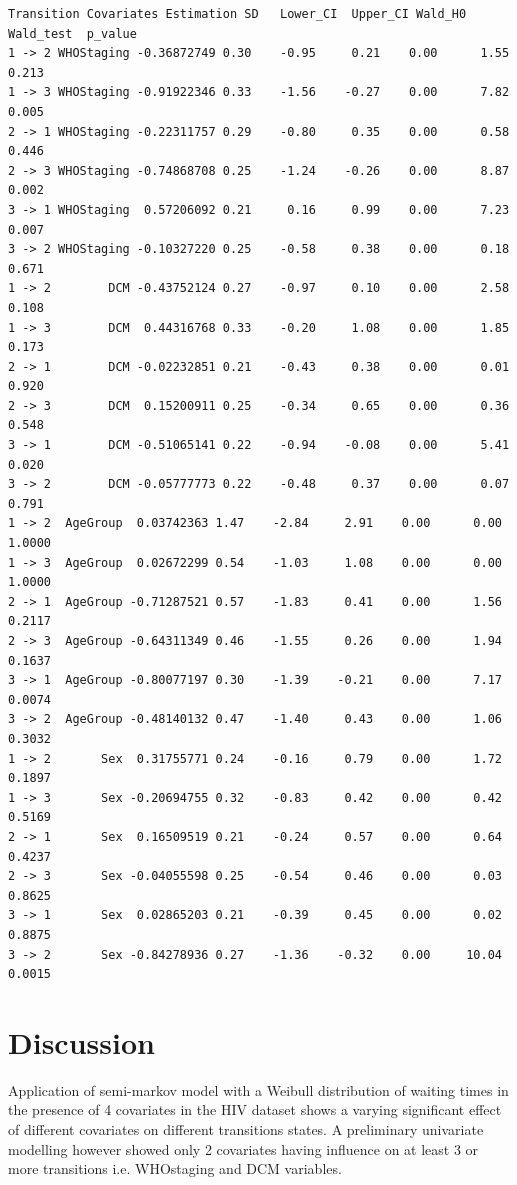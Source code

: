 \documentclass[11pt]{article}
\begin{document}
\begin{verbatim}
Transition Covariates Estimation SD   Lower_CI  Upper_CI Wald_H0 Wald_test  p_value
1 -> 2 WHOStaging -0.36872749 0.30    -0.95     0.21    0.00      1.55  0.213
1 -> 3 WHOStaging -0.91922346 0.33    -1.56    -0.27    0.00      7.82  0.005
2 -> 1 WHOStaging -0.22311757 0.29    -0.80     0.35    0.00      0.58  0.446
2 -> 3 WHOStaging -0.74868708 0.25    -1.24    -0.26    0.00      8.87  0.002
3 -> 1 WHOStaging  0.57206092 0.21     0.16     0.99    0.00      7.23  0.007
3 -> 2 WHOStaging -0.10327220 0.25    -0.58     0.38    0.00      0.18  0.671
1 -> 2        DCM -0.43752124 0.27    -0.97     0.10    0.00      2.58  0.108
1 -> 3        DCM  0.44316768 0.33    -0.20     1.08    0.00      1.85  0.173
2 -> 1        DCM -0.02232851 0.21    -0.43     0.38    0.00      0.01  0.920
2 -> 3        DCM  0.15200911 0.25    -0.34     0.65    0.00      0.36  0.548
3 -> 1        DCM -0.51065141 0.22    -0.94    -0.08    0.00      5.41  0.020
3 -> 2        DCM -0.05777773 0.22    -0.48     0.37    0.00      0.07  0.791
1 -> 2  AgeGroup  0.03742363 1.47    -2.84     2.91    0.00      0.00  1.0000
1 -> 3  AgeGroup  0.02672299 0.54    -1.03     1.08    0.00      0.00  1.0000
2 -> 1  AgeGroup -0.71287521 0.57    -1.83     0.41    0.00      1.56  0.2117
2 -> 3  AgeGroup -0.64311349 0.46    -1.55     0.26    0.00      1.94  0.1637
3 -> 1  AgeGroup -0.80077197 0.30    -1.39    -0.21    0.00      7.17  0.0074
3 -> 2  AgeGroup -0.48140132 0.47    -1.40     0.43    0.00      1.06  0.3032
1 -> 2       Sex  0.31755771 0.24    -0.16     0.79    0.00      1.72  0.1897
1 -> 3       Sex -0.20694755 0.32    -0.83     0.42    0.00      0.42  0.5169
2 -> 1       Sex  0.16509519 0.21    -0.24     0.57    0.00      0.64  0.4237
2 -> 3       Sex -0.04055598 0.25    -0.54     0.46    0.00      0.03  0.8625
3 -> 1       Sex  0.02865203 0.21    -0.39     0.45    0.00      0.02  0.8875
3 -> 2       Sex -0.84278936 0.27    -1.36    -0.32    0.00     10.04  0.0015
\end{verbatim}



	\section{Discussion}\label{discussion}
Application of semi-markov model with a Weibull distribution of waiting times in the presence of 4 covariates in the HIV dataset shows a varying significant effect of different covariates on different transitions states. A preliminary univariate modelling however showed only 2 covariates having influence on at least 3 or more transitions i.e. WHOstaging and DCM variables.
\end{document}
